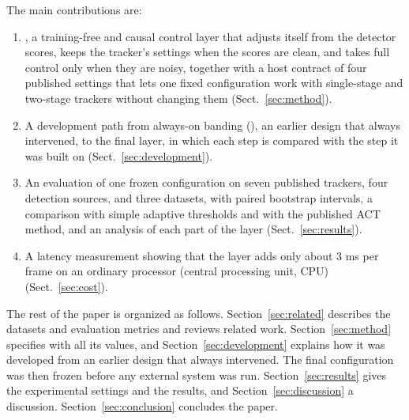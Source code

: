 The main contributions are:
\begin{enumerate}
\item \scl{}, a training-free and causal control layer that adjusts itself from the detector scores,
      keeps the tracker's settings when the scores are clean, and takes full control only when they
      are noisy, together with a host contract of four published settings that lets one fixed
      configuration work with single-stage and two-stage trackers without changing them
      (Sect.~\ref{sec:method}).
\item A development path from always-on banding (\aob{}), an earlier design that always
      intervened, to the final layer, in which each step is compared with the step it was built on
      (Sect.~\ref{sec:development}).
\item An evaluation of one frozen configuration on seven published trackers, four detection
      sources, and three datasets, with paired bootstrap intervals, a comparison with simple
      adaptive thresholds and with the published ACT method, and an analysis of each part of the
      layer (Sect.~\ref{sec:results}).
\item A latency measurement showing that the layer adds only about 3 ms per frame on an ordinary
      processor (central processing unit, CPU) (Sect.~\ref{sec:cost}).
\end{enumerate}

The rest of the paper is organized as follows. Section~\ref{sec:related} describes the datasets and
evaluation metrics and reviews related work. Section~\ref{sec:method} specifies \scl{} with all its
values, and Section~\ref{sec:development} explains how it was developed from an earlier design that
always intervened. The final configuration was then frozen before any external system was run.
Section~\ref{sec:results} gives the experimental settings and the results, and
Section~\ref{sec:discussion} a discussion. Section~\ref{sec:conclusion} concludes the paper.
